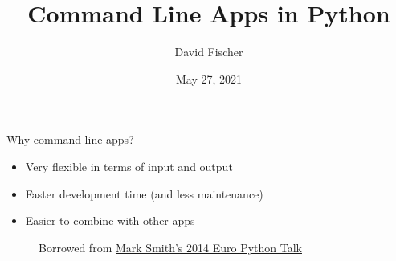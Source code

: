 \documentclass[handout]{beamer}
\title{Command Line Apps in Python}
\author{David Fischer}
\date{May 27, 2021}
\begin{document}
\maketitle

\begin{frame}
\frametitle{}
  {\huge Why command line apps?}
\end{frame}


\begin{frame}
  \begin{itemize}
    \item Very flexible in terms of input and output
    \item Faster development time (and less maintenance)
    \item Easier to combine with other apps
  \end{itemize}
\end{frame}


\begin{frame}
  \begin{figure}[p]
    \centering
    \caption{Borrowed from \href{http://pyvideo.org/europython-2014/writing-awesome-command-line-programs-in-python.html}{Mark Smith's 2014 Euro Python Talk}}
  \end{figure}
\end{frame}
\end{document}
